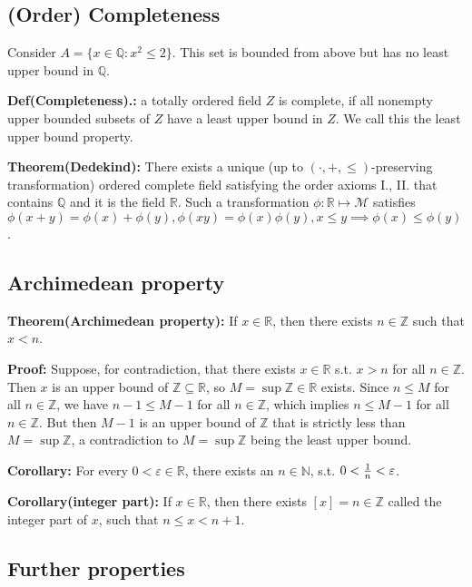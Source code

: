 \documentclass{article}
\begin{document}
\subsection{(Order) Completeness}

Consider $A=\{x\in \mathbb{Q}:x^2\leq 2\}$. This set is bounded from above but has no least upper bound in $\mathbb{Q}$.

\textbf{Def(Completeness).:} a totally ordered field $Z$ is complete, if all nonempty upper bounded subsets of $Z$ have a least upper bound in $Z$. We call this the least upper bound property.

\textbf{Theorem(Dedekind):} There exists a unique (up to $(\cdot, +,\leq)$-preserving transformation) ordered complete field satisfying the order axioms I., II. that contains $\mathbb{Q}$ and it is the field $\mathbb{R}$.
Such a transformation $\phi:\mathbb{R}\mapsto \mathcal{M}$ satisfies $\phi(x+y)=\phi(x)+\phi(y), \phi(xy)=\phi(x)\phi(y), x\leq y \implies \phi(x)\leq \phi(y)$.


\subsection{Archimedean property}

\textbf{Theorem(Archimedean property):} If $x\in \mathbb{R}$, then there exists $n\in \mathbb{Z}$ such that $x<n$.

\textbf{Proof:} Suppose, for contradiction, that there exists $x\in \mathbb{R}$ s.t. $x>n$ for all $n\in \mathbb{Z}$. Then $x$ is an upper bound of $\mathbb{Z\subseteq\mathbb{R}}$, so $M=\sup\mathbb{Z}\in\mathbb{R}$ exists. Since $n\leq M$ for all $n\in \mathbb{Z}$, we have $n-1\leq M-1$ for all $n\in \mathbb{Z}$, which implies $n\leq M-1$ for all $n\in \mathbb{Z}$. But then $M-1$ is an upper bound of $\mathbb{Z}$ that is strictly less than $M=\sup \mathbb{Z}$, a contradiction to $M=\sup \mathbb{Z}$ being the least upper bound.

\textbf{Corollary:} For every $0<\varepsilon\in \mathbb{R}$, there exists an $n\in \mathbb{N}$, s.t. $0<{1\over n}<\varepsilon$.

\textbf{Corollary(integer part):} If $x\in \mathbb{R}$, then there exists $[x]=n\in \mathbb{Z}$ called the integer part of $x$, such that $n\leq x<n+1$.


\subsection{Further properties}
\end{document}
